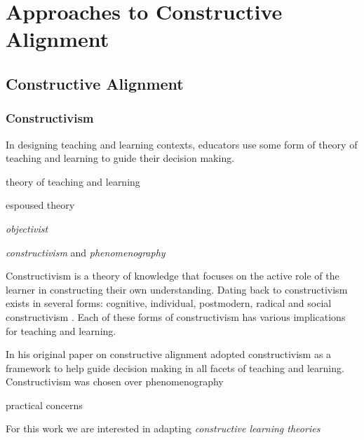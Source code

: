 
\chapter{Approaches to Constructive Alignment} %
\label{cha:background}

\section{Constructive Alignment} %
\label{sec:constructive_alignment}

\subsection{Constructivism} %
\label{sub:constructivism}

In designing teaching and learning contexts, educators use some form of theory of teaching and learning to guide their decision making.

theory of teaching and learning

espoused theory \cite{Argyris:1976}

\emph{objectivist}

\emph{constructivism} and \emph{phenomenography}







\cite{Montessori:1946}

Constructivism is a theory of knowledge that focuses on the active role of the learner in constructing their own understanding. Dating back to \citet{Piaget:1950} constructivism exists in several forms: cognitive, individual, postmodern, radical and social constructivism \cite{Phillips:1995,Steffe:1995}. Each of these forms of constructivism has various implications for teaching and learning.









In his original paper on constructive alignment \citet{Biggs:1996c} adopted constructivism as a framework to help guide decision making in all facets of teaching and learning. Constructivism was chosen over phenomenography 

practical concerns


For this work we are interested in adapting \emph{constructive learning theories}

